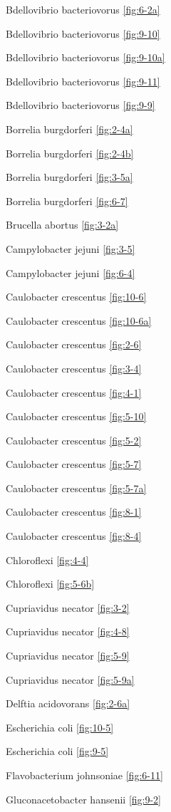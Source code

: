 \documentclass[]{tufte-book}
\begin{document}
Bdellovibrio bacteriovorus \ref{fig:6-2a}

Bdellovibrio bacteriovorus \ref{fig:9-10}

Bdellovibrio bacteriovorus \ref{fig:9-10a}

Bdellovibrio bacteriovorus \ref{fig:9-11}

Bdellovibrio bacteriovorus \ref{fig:9-9}

Borrelia burgdorferi \ref{fig:2-4a}

Borrelia burgdorferi \ref{fig:2-4b}

Borrelia burgdorferi \ref{fig:3-5a}

Borrelia burgdorferi \ref{fig:6-7}

Brucella abortus \ref{fig:3-2a}

Campylobacter jejuni \ref{fig:3-5}

Campylobacter jejuni \ref{fig:6-4}

Caulobacter crescentus \ref{fig:10-6}

Caulobacter crescentus \ref{fig:10-6a}

Caulobacter crescentus \ref{fig:2-6}

Caulobacter crescentus \ref{fig:3-4}

Caulobacter crescentus \ref{fig:4-1}

Caulobacter crescentus \ref{fig:5-10}

Caulobacter crescentus \ref{fig:5-2}

Caulobacter crescentus \ref{fig:5-7}

Caulobacter crescentus \ref{fig:5-7a}

Caulobacter crescentus \ref{fig:8-1}

Caulobacter crescentus \ref{fig:8-4}

Chloroflexi \ref{fig:4-4}

Chloroflexi \ref{fig:5-6b}

Cupriavidus necator \ref{fig:3-2}

Cupriavidus necator \ref{fig:4-8}

Cupriavidus necator \ref{fig:5-9}

Cupriavidus necator \ref{fig:5-9a}

Delftia acidovorans \ref{fig:2-6a}

Escherichia coli \ref{fig:10-5}

Escherichia coli \ref{fig:9-5}

Flavobacterium johnsoniae \ref{fig:6-11}

Gluconacetobacter hansenii \ref{fig:9-2}
\end{document}
